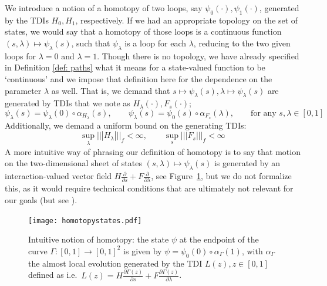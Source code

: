 We introduce a notion of a homotopy of two loops, say $\psi_0(\cdot),\psi_1(\cdot)$, generated by the TDIs $H_0, H_1$, respectively. 
If we had an appropriate topology on the set of states, we would say that a homotopy of those loops is a continuous function $(s,\lambda)\mapsto \psi_\lambda(s)$, such that $\psi_\lambda$ is a loop for each $\lambda$, reducing to the two given loops for $\lambda=0$ and $\lambda=1$. 
Though there is no topology,  we have  already specified in Definition \ref{def: paths} what it means for a state-valued function to be `continuous' and we impose that definition here for the dependence on the parameter $\lambda$ as well.  That is, we demand that $s\mapsto \psi_\lambda(s),\lambda\mapsto \psi_\lambda(s) $ are generated by TDIs that we note as $H_\lambda(\cdot), F_s(\cdot)$;
\begin{equation}\label{eq: homotopy}
	\psi_\lambda(s)= \psi_\lambda(0) \circ \alpha_{H_\lambda}(s),\qquad
	\psi_\lambda(s)= \psi_0(s) \circ \alpha_{F_s}(\lambda),\qquad \text{for any $s, \lambda \in[0,1]$}
\end{equation}
Additionally, we demand a uniform bound on the generating TDIs:
\begin{equation}\label{Homotopy: Uniform bound}
	\sup_{\lambda} ||| H_\lambda |||_f <  \infty,\qquad \sup_s  ||| F_s |||_f  <\infty
\end{equation}
A more intuitive way of phrasing our definition of homotopy is to say that motion on the 
two-dimensional sheet of states $(s,\lambda)\mapsto \psi_\lambda(s)$ is generated by an interaction-valued vector field $H\frac{\partial}{\partial s} + F\frac{\partial}{\partial \lambda} $, see Figure~\ref{fig: homotopy states}, but we do not formalize this, as it would require technical conditions that are ultimately not relevant for our goals (but see \cite{kapustin2022local}).

\begin{figure}[h]
	\begin{center}
		\texttt{[image: homotopystates.pdf]}
		\caption{Intuitive notion of homotopy: the state $\psi$ at the endpoint of the curve $\Gamma: [0,1]\to [0,1]^2$ is given by  $\psi=\psi_0(0)\circ \alpha_\Gamma(1)$, with $\alpha_\Gamma$ the almost local evolution generated by the TDI $L(z), z\in [0,1]$  defined as i.e.\  
			$L(z)= H\frac{\partial \Gamma(z)}{\partial s} + F\frac{\partial \Gamma(z)}{\partial \lambda} $. }
		\label{fig: homotopy states}
	\end{center}
\end{figure} 

